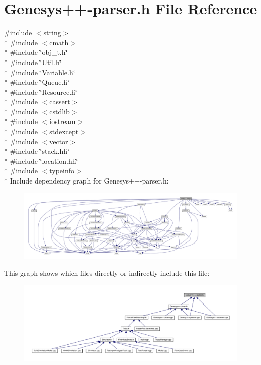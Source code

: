 \hypertarget{_genesys_09_09-parser_8h}{\section{Genesys++-\/parser.h File Reference}
\label{_genesys_09_09-parser_8h}
}
{\ttfamily \#include $<$string$>$}\\*
{\ttfamily \#include $<$cmath$>$}\\*
{\ttfamily \#include \char`\"{}obj\-\_\-t.\-h\char`\"{}}\\*
{\ttfamily \#include \char`\"{}Util.\-h\char`\"{}}\\*
{\ttfamily \#include \char`\"{}Variable.\-h\char`\"{}}\\*
{\ttfamily \#include \char`\"{}Queue.\-h\char`\"{}}\\*
{\ttfamily \#include \char`\"{}Resource.\-h\char`\"{}}\\*
{\ttfamily \#include $<$cassert$>$}\\*
{\ttfamily \#include $<$cstdlib$>$}\\*
{\ttfamily \#include $<$iostream$>$}\\*
{\ttfamily \#include $<$stdexcept$>$}\\*
{\ttfamily \#include $<$vector$>$}\\*
{\ttfamily \#include \char`\"{}stack.\-hh\char`\"{}}\\*
{\ttfamily \#include \char`\"{}location.\-hh\char`\"{}}\\*
{\ttfamily \#include $<$typeinfo$>$}\\*
Include dependency graph for Genesys++-\/parser.h\-:
\nopagebreak
\begin{figure}[H]
\begin{center}
\leavevmode
\includegraphics[width=350pt]{_genesys_09_09-parser_8h__incl}
\end{center}
\end{figure}
This graph shows which files directly or indirectly include this file\-:
\nopagebreak
\begin{figure}[H]
\begin{center}
\leavevmode
\includegraphics[width=350pt]{_genesys_09_09-parser_8h__dep__incl}
\end{center}
\end{figure}
